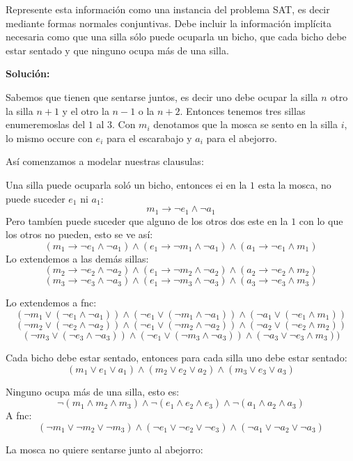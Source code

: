 \documentclass[11pt,letterpaper]{article}
\begin{document}
\begin{enumerate}
Represente esta información como una instancia del problema SAT, es decir mediante formas normales conjuntivas. Debe incluir la información implícita necesaria como que una silla sólo puede ocuparla un bicho, que cada bicho debe estar sentado y que ninguno ocupa más de una silla.

{\bf Solución:}

Sabemos que tienen que sentarse juntos, es decir uno debe ocupar la silla $n$ otro la silla $n+1$ y el otro la $n-1$ o la $n+2$. Entonces tenemos tres sillas
enumeremoslas del $1$ al $3$. Con $m_i$ denotamos que la mosca se sento en la silla $i$, lo mismo occure con $e_i$ para el escarabajo y $a_i$ para el abejorro.

Así comenzamos a modelar nuestras clausulas:

Una silla puede ocuparla soló un bicho, entonces ei en la $1$ esta la mosca, no puede suceder $e_1$ ni $a_1$:
$$ m_1 \rightarrow \neg e_1 \land\neg a_1$$
Pero tambíen puede suceder que alguno de los otros dos este en la $1$ con lo que los otros no pueden, esto se ve así:
$$ (m_1 \rightarrow \neg e_1 \land \neg a_1) \land (e_1 \rightarrow\neg m_1 \land \neg a_1) \land (a_1 \rightarrow \neg e_1 \land m_1)$$
Lo extendemos a las demás sillas:
$$ (m_2 \rightarrow \neg e_2 \land \neg a_2) \land (e_1 \rightarrow\neg m_2 \land \neg a_2) \land (a_2 \rightarrow \neg e_2 \land m_2)$$
$$ (m_3 \rightarrow \neg e_3 \land \neg a_3) \land (e_1 \rightarrow\neg m_3 \land \neg a_3) \land (a_3 \rightarrow \neg e_3 \land m_3)$$

Lo extendemos a fnc:
$$ (\neg m_1 \lor (\neg e_1 \land \neg a_1)) \land (\neg e_1 \lor(\neg m_1 \land \neg a_1)) \land (\neg a_1 \lor( \neg e_1 \land m_1))$$
$$ (\neg m_2 \lor (\neg e_2 \land \neg a_2)) \land (\neg e_1 \lor(\neg m_2 \land \neg a_2)) \land (\neg a_2 \lor(\neg e_2 \land m_2))$$
$$ (\neg m_3 \lor (\neg e_3 \land \neg a_3)) \land (\neg e_1 \lor(\neg m_3 \land \neg a_3)) \land (\neg a_3 \lor \neg e_3 \land m_3))$$

Cada bicho debe estar sentado, entonces para cada silla uno debe estar sentado:
$$ (m_1\lor e_1\lor a_1) \land (m_2\lor e_2\lor a_2) \land (m_3\lor e_3\lor a_3)$$

Ninguno ocupa más de una silla, esto es:
$$ \neg(m_1\land m_2\land m_3) \land \neg(e_1\land e_2\land e_3) \land  \neg(a_1\land a_2\land a_3) $$
A fnc:
$$ (\neg m_1\lor \neg m_2\lor \neg m_3) \land (\neg e_1\lor \neg e_2\lor \neg e_3) \land  (\neg a_1\lor  \neg a_2\lor \neg a_3) $$

La mosca no quiere sentarse junto al abejorro:


\end{enumerate}
\end{document}
